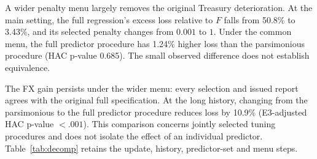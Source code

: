 A wider penalty menu largely removes the original Treasury deterioration. At the main setting, the full regression's excess loss relative to $F$ falls from 50.8\% to 3.43\%, and its selected penalty changes from $0.001$ to $1$. Under the common menu, the full predictor procedure has 1.24\% higher loss than the parsimonious procedure (HAC p-value 0.685). The small observed difference does not establish equivalence.

The FX gain persists under the wider menu: every selection and issued report agrees with the original full specification. At the long history, changing from the parsimonious to the full predictor procedure reduces loss by 10.9\% (E3-adjusted HAC p-value $<.001$). This comparison concerns jointly selected tuning procedures and does not isolate the effect of an individual predictor. Table~\ref{tab:decomp} retains the update, history, predictor-set and menu steps.
